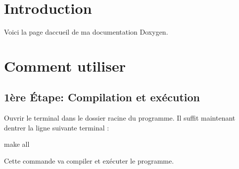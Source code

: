 \hypertarget{index_intro_sec}{}\section{Introduction}\label{index_intro_sec}
Voici la page d\textquotesingle{}accueil de ma documentation Doxygen. \hypertarget{index_howto_sec}{}\section{Comment utiliser}\label{index_howto_sec}
\hypertarget{index_etape1}{}\subsection{1ère Étape\+: Compilation et exécution}\label{index_etape1}
Ouvrir le terminal dans le dossier racine du programme. Il suffit maintenant d\textquotesingle{}entrer la ligne suivante terminal \+: \begin{DoxyVerb}make all
\end{DoxyVerb}
 Cette commande va compiler et exécuter le programme. 